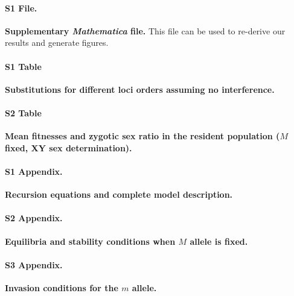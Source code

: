 \documentclass[10pt,letterpaper]{article}
\begin{document}
\paragraph*{S1 File.}
\label{file:Mathematica}
{\bf Supplementary \textit{Mathematica} file.}  This file can be used to re-derive our results and generate figures. 

\paragraph*{S1 Table}
\label{tab:chisubstitutions}
{\bf Substitutions for different loci orders assuming no interference.}

\paragraph*{S2 Table}
\label{tab:meanfitnesses}
{\bf Mean fitnesses and zygotic sex ratio in the resident population ($M$ fixed, XY sex determination). }

\paragraph*{S1 Appendix.}
\label{app:recurs}
{\bf Recursion equations and complete model description.} 

\paragraph*{S2 Appendix.}
\label{app:eq_stab}
{\bf Equilibria and stability conditions when $M$ allele is fixed. } 

\paragraph*{S3 Appendix.}
\label{app:inv_cond}
{\bf Invasion conditions for the $m$ allele.} 

\end{document}
